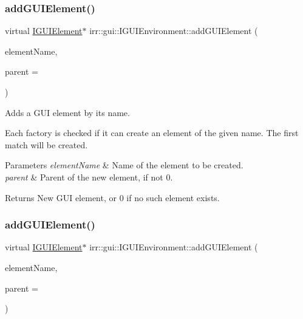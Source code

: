 \subsubsection{\texorpdfstring{add\+G\+U\+I\+Element()}{addGUIElement()}\hspace{0.1cm}{\footnotesize\ttfamily [1/2]}}
{\footnotesize\ttfamily virtual \hyperlink{classirr_1_1gui_1_1IGUIElement}{I\+G\+U\+I\+Element}$\ast$ irr\+::gui\+::\+I\+G\+U\+I\+Environment\+::add\+G\+U\+I\+Element (\begin{DoxyParamCaption}\item[{const \hyperlink{namespaceirr_a9395eaea339bcb546b319e9c96bf7410}{c8} $\ast$}]{element\+Name,  }\item[{\hyperlink{classirr_1_1gui_1_1IGUIElement}{I\+G\+U\+I\+Element} $\ast$}]{parent = {} }\end{DoxyParamCaption})\hspace{0.3cm}{\ttfamily [pure virtual]}}



Adds a G\+UI element by its name. 

Each factory is checked if it can create an element of the given name. The first match will be created. 
\begin{DoxyParams}{Parameters}
{\em element\+Name} & Name of the element to be created. \\
\hline
{\em parent} & Parent of the new element, if not 0. \\
\hline
\end{DoxyParams}
\begin{DoxyReturn}{Returns}
New G\+UI element, or 0 if no such element exists. 
\end{DoxyReturn}
\mbox{\label{classirr_1_1gui_1_1IGUIEnvironment_a17114e35fc67f6d54df1baebb806f3b7}} 
\subsubsection{\texorpdfstring{add\+G\+U\+I\+Element()}{addGUIElement()}\hspace{0.1cm}{\footnotesize\ttfamily [2/2]}}
{\footnotesize\ttfamily virtual \hyperlink{classirr_1_1gui_1_1IGUIElement}{I\+G\+U\+I\+Element}$\ast$ irr\+::gui\+::\+I\+G\+U\+I\+Environment\+::add\+G\+U\+I\+Element (\begin{DoxyParamCaption}\item[{const \hyperlink{namespaceirr_a9395eaea339bcb546b319e9c96bf7410}{c8} $\ast$}]{element\+Name,  }\item[{\hyperlink{classirr_1_1gui_1_1IGUIElement}{I\+G\+U\+I\+Element} $\ast$}]{parent = {} }\end{DoxyParamCaption})\hspace{0.3cm}{\ttfamily [pure virtual]}}



